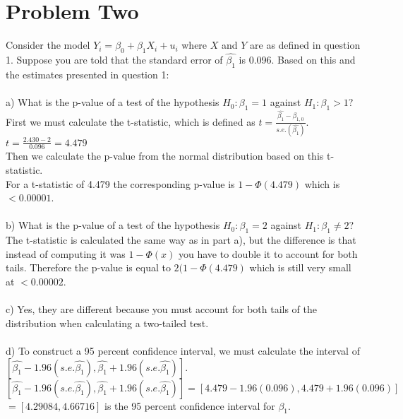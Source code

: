 \documentclass[11pt, oneside]{article}   	%
\begin{document}
\section{Problem Two}
Consider the model $Y_i = \beta_0 + \beta_1X_i + u_i$ where $X$ and $Y$ are as defined in question 1. Suppose you are told that the standard error of $\hat{\beta_1}$ is 0.096. Based on this and the estimates presented in question 1:\\~\\
a) What is the p-value of a test of the hypothesis $H_0: \beta_1 = 1$ against $H_1: \beta_1 >1$?\\
First we must calculate the t-statistic, which is defined as $t = \frac{\hat{\beta_1} - \beta_{1,0}}{s.e.(\hat{\beta_1})}$.\\
$t = \frac{2.430 - 2}{0.096} = 4.479$\\
Then we calculate the p-value from the normal distribution based on this t-statistic.\\
For a t-statistic of 4.479 the corresponding p-value is $1 - \Phi(4.479)$ which is  $< 0.00001$.\\~\\
b) What is the p-value of a test of the hypothesis $H_0: \beta_1 = 2$ against $H_1: \beta_1 \neq 2$?\\
The t-statistic is calculated the same way as in part a), but the difference is that instead of computing it was $1 - \Phi(x)$ you have to double it to account for both tails. Therefore the p-value is equal to $2(1-\Phi(4.479)$ which is still very small at $<0.00002$. \\~\\
c) Yes, they are different because you must account for both tails of the distribution when calculating a two-tailed test.\\~\\
d) To construct a 95 percent confidence interval, we must calculate the interval of $[\hat{\beta_1} - 1.96(s.e. \hat{\beta_1}), \hat{\beta_1} + 1.96(s.e. \hat{\beta_1})]$.\\
$[\hat{\beta_1} - 1.96(s.e. \hat{\beta_1}), \hat{\beta_1} + 1.96(s.e. \hat{\beta_1})] = [4.479 - 1.96(0.096), 4.479 + 1.96(0.096)]$\\
$ = [4.29084, 4.66716]$ is the 95 percent confidence interval for $\beta_1$.\\
\end{document}
